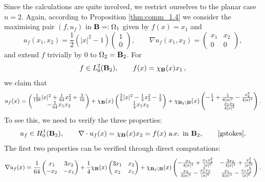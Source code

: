 \documentclass[11pt]{article}
\theoremstyle{plain}
\theoremstyle{definition}
\numberwithin{equation}{section}
\newcommand{\B}{{\bf B}}
\begin{document}
\begin{appendix}
Since the calculations are quite involved, we restrict ourselves to the planar case $n=2$. Again, according to Proposition
\ref{thm:comm_1.4} we consider the maximising pair $(f,u_f)$ in $\B=:\Omega_1$ given by $f(x)=x_1$ and
$$
u_f(x_1,x_2)= \frac12 (|x|^2-1)\begin{pmatrix}1\\0 \end{pmatrix},
\qquad \nabla u_f(x_1,x_2)= \begin{pmatrix} x_1&x_2\\ 0&0 \end{pmatrix},
$$
and extend $f$ trivially by $0$ to $\Omega_2=\B_2$. For
\begin{equation}\label{againf}
	f \in L^2_0(\B_2), \qquad  f(x)=\chi_\B (x) x_1\, ,
\end{equation}
we  claim that
\begin{equation}\label{ansatz}
	u_f(x)=\begin{pmatrix}\frac{1}{128} |x|^2 +\frac{1}{64}x_2^2 +\frac{3}{16}\\-\frac{1}{64} x_1 x_2\end{pmatrix}
	+\chi_{\B} (x) \begin{pmatrix}\frac{3}{8}|x|^2 -\frac{1}{4}x_2^2 -\frac{1}{2}\\ \frac{1}{4} x_1 x_2\end{pmatrix}
	+\chi_{\B_2\setminus \B} (x)\begin{pmatrix}-\frac14+\frac{1}{8|x|^2}-\frac{x_2^2}{4|x|^4}\\ \frac{x_1 x_2}{4 |x|^4}	\end{pmatrix}.
\end{equation}
To see this, we need to verify the three properties:
$$
u_f\in H^1_0(\B_2),\qquad \nabla \cdot u_f(x)=\chi_{\B} (x)x_2=f(x)\mbox{ a.e. in }\B_2,\qquad\mbox{\eqref{gstokes}}.
$$
The first two properties can be verified through direct computations:
$$
\nabla u_f(x)=\frac{1}{64}\begin{pmatrix} x_1 & 3x_2\\ -x_2 &-x_1 \end{pmatrix}
+\frac14\chi_{\B} (x) \begin{pmatrix} 3x_1 & x_2\\ x_2 & x_1 \end{pmatrix}
+\chi_{\B_2\setminus \B} (x)\begin{pmatrix}-\frac{x_1}{4|x|^4}+\frac{x_1x_2^2}{|x|^6} & -\frac{3x_2}{4|x|^4}+\frac{x_2^3}{|x|^6} \\
	\frac{x_2}{4|x|^4}-\frac{x_1^2x_2}{|x|^6}  & \frac{x_1}{4|x|^4}-\frac{x_1x_2^2}{|x|^6}\end{pmatrix}.
$$
\end{appendix}
\end{document}
